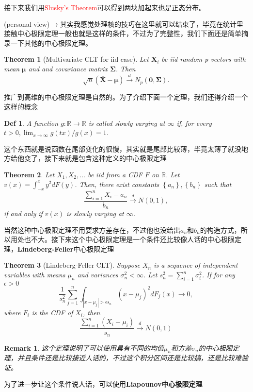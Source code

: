 \documentclass{article}
\newtheorem{theorem}{Theorem}[section]
\newtheorem{defination}{Def}[section]
\newtheorem{remark}{Remark}[theorem]
\begin{document}
接下来我们用\textcolor{red}{Slusky's Theorem}可以得到两块加起来也是正态分布。
\par (personal view)$\to$其实我感觉处理核的技巧在这里就可以结束了，毕竟在统计里接触中心极限定理一般也就是这样的条件，不过为了完整性，我们下面还是简单摘录一下其他的中心极限定理。
\begin{theorem}[Multivariate CLT for iid case]
	 Let $\mathbf{X}_i$ be iid random p-vectors with mean $\boldsymbol{\mu}$ and and covariance matrix $\boldsymbol{\Sigma}$. Then
	$$
	\sqrt{n}(\overline{\mathbf{X}}-\boldsymbol{\mu}) \stackrel{d}{\rightarrow} N_p(\mathbf{0}, \boldsymbol{\Sigma}) .
	$$
\end{theorem}
推广到高维的中心极限定理是自然的。为了介绍下面一个定理，我们还得介绍一个这样的概念
\begin{defination}
	A function $g: \mathbb{R} \rightarrow \mathbb{R}$ is called slowly varying at $\infty$ if, for every $t>0, \lim _{x \rightarrow \infty} g(t x) / g(x)=1$.
\end{defination}
这个东西就是说函数在尾部变化的很慢，其实就是尾部比较薄，毕竟太薄了就没地方给他变了，接下来就是包含这种定义的中心极限定理
\begin{theorem}
	Let $X_1, X_2, \ldots$ be iid from a CDF $F$ on $\mathbb{R}$. Let $v(x)=\int_{-x}^x y^2 d F(y)$. Then, there exist constants $\left\{a_n\right\},\left\{b_n\right\}$ such that
	$$
	\frac{\sum_{i=1}^n X_i-a_n}{b_n} \stackrel{d}{\rightarrow} N(0,1),
	$$
	if and only if $v(x)$ is slowly varying at $\infty$.
\end{theorem}
当然这种中心极限定理不用要求方差存在，不过他也没给出$a_n$和$b_n$的构造方式，所以用处也不大。接下来这个中心极限定理是一个条件还比较像人话的中心极限定理，\textbf{Lindeberg-Feller}中心极限定理
\begin{theorem}[Lindeberg-Feller CLT]
	Suppose $X_n$ is a sequence of independent variables with means $\mu_n$ and variances $\sigma_n^2<\infty$. Let $s_n^2=\sum_{i=1}^n \sigma_i^2$. If for any $\epsilon>0$
	$$
	\frac{1}{s_n^2} \sum_{j=1}^n \int_{\left|x-\mu_j\right|>\epsilon s_n}\left(x-\mu_j\right)^2 d F_j(x) \rightarrow 0,
	$$
	where $F_i$ is the CDF of $X_i$, then
	$$
	\frac{\sum_{i=1}^n\left(X_i-\mu_i\right)}{s_n} \stackrel{d}{\rightarrow} N(0,1)
	$$
\end{theorem}
\begin{remark}
	这个定理说明了可以使用具有不同的均值$\mu_n$和方差$\sigma_n$的中心极限定理，并且条件还是比较接近人话的，不过这个积分区间还是比较搞，还是比较难验证。
\end{remark}
为了进一步让这个条件说人话，可以使用\textbf{Liapounov中心极限定理}
\end{document}
